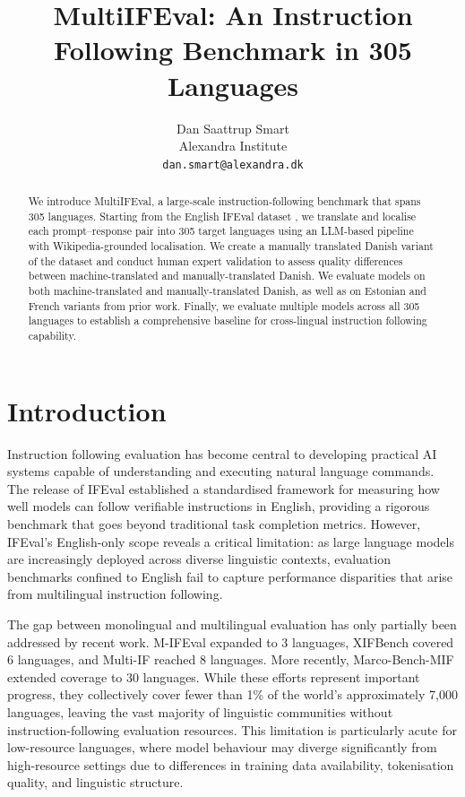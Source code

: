\documentclass[11pt]{article}
\title{MultiIFEval: An Instruction Following Benchmark in 305 Languages}
\author{Dan Saattrup Smart \\
  Alexandra Institute \\
  \texttt{dan.smart@alexandra.dk}\\
}
\begin{document}
\maketitle


\begin{abstract}

We introduce MultiIFEval, a large‑scale instruction‑following benchmark that spans 305
languages. Starting from the English IFEval dataset \cite{zhou2023ifeval}, we translate
and localise each prompt–response pair into 305 target languages using an LLM-based
pipeline with Wikipedia-grounded localisation. We create a manually translated Danish
variant of the dataset and conduct human expert validation to assess quality differences
between machine-translated and manually-translated Danish. We evaluate models on both
machine-translated and manually-translated Danish, as well as on Estonian \cite{dorkin2025ifeval-et}
and French \cite{alhajar2024ifeval-fr} variants from prior work. Finally, we evaluate
multiple models across all 305 languages to establish a comprehensive baseline for
cross-lingual instruction following capability.

\end{abstract}


\section{Introduction}
\label{sec:intro}

Instruction following evaluation has become central to developing practical AI systems
capable of understanding and executing natural language commands. The release of IFEval
\cite{zhou2023ifeval} established a standardised framework for measuring how well models
can follow verifiable instructions in English, providing a rigorous benchmark that goes
beyond traditional task completion metrics. However, IFEval's English-only scope reveals
a critical limitation: as large language models are increasingly deployed across diverse
linguistic contexts, evaluation benchmarks confined to English fail to capture
performance disparities that arise from multilingual instruction following.

The gap between monolingual and multilingual evaluation has only partially been addressed
by recent work. M-IFEval \cite{li2025xifbench} expanded to 3 languages, XIFBench
\cite{he2024multi} covered 6 languages, and Multi-IF \cite{he2024multi} reached 8
languages. More recently, Marco-Bench-MIF \cite{zeng-etal-2025-marco} extended coverage
to 30 languages. While these efforts represent important progress, they collectively
cover fewer than 1\% of the world's approximately 7,000 languages, leaving the vast
majority of linguistic communities without instruction-following evaluation resources.
This limitation is particularly acute for low-resource languages, where model behaviour
may diverge significantly from high-resource settings due to differences in training
data availability, tokenisation quality, and linguistic structure.
\end{document}
